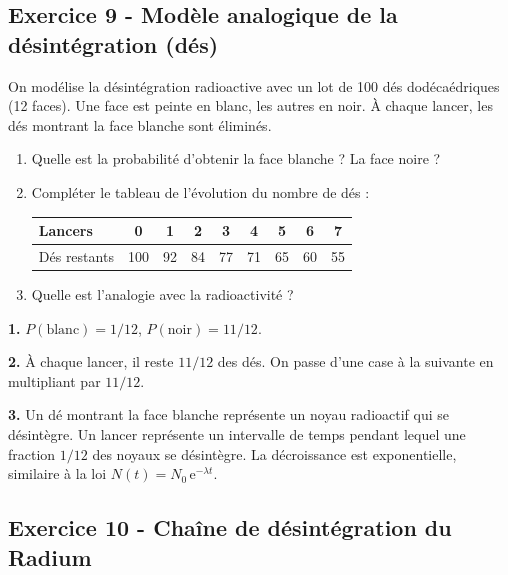 \documentclass[12pt,a4paper]{article}
\begin{document}
\subsection*{Exercice 9 - Modèle analogique de la désintégration (dés) \niveau{\facile}}

\begin{boiteexercice}
On modélise la désintégration radioactive avec un lot de 100 dés dodécaédriques (12 faces). Une face est peinte en blanc, les autres en noir. À chaque lancer, les dés montrant la face blanche sont éliminés.
\begin{enumerate}
  \item Quelle est la probabilité d'obtenir la face blanche ? La face noire ?
  \item Compléter le tableau de l'évolution du nombre de dés :
  \begin{center}
  \begin{tabular}{|l|c|c|c|c|c|c|c|c|}
  \hline
  Lancers & 0 & 1 & 2 & 3 & 4 & 5 & 6 & 7 \\
  \hline
  Dés restants & 100 & 92 & 84 & 77 & 71 & 65 & 60 & 55 \\
  \hline
  \end{tabular}
  \end{center}
  \item Quelle est l'analogie avec la radioactivité ?
\end{enumerate}
\end{boiteexercice}

\begin{boitecorrige}
\textbf{1.} $P(\text{blanc}) = 1/12$, $P(\text{noir}) = 11/12$.

\textbf{2.} À chaque lancer, il reste $11/12$ des dés. On passe d'une case à la suivante en multipliant par $11/12$.

\textbf{3.} Un dé montrant la face blanche représente un noyau radioactif qui se désintègre. Un lancer représente un intervalle de temps pendant lequel une fraction $1/12$ des noyaux se désintègre. La décroissance est exponentielle, similaire à la loi $N(t) = N_0\,\mathrm{e}^{-\lambda t}$.
\end{boitecorrige}

\subsection*{Exercice 10 - Chaîne de désintégration du Radium \niveau{\moyen}}
\end{document}
